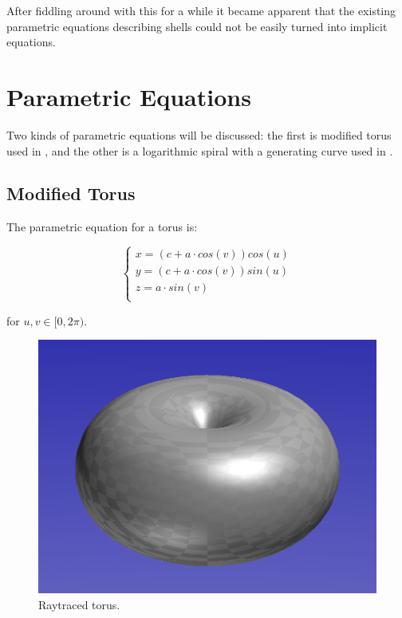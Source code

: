 \documentclass[a4paper]{article}
\begin{document}
After fiddling around with this for a while it became apparent that the existing parametric equations describing shells could not be easily turned into implicit equations.

\section{Parametric Equations}

Two kinds of parametric equations will be discussed: the first is modified torus used in \cite{povray-seashells}, and the other is a logarithmic spiral with a generating curve used in \cite{JORGEPICADO}.

\subsection{Modified Torus}

The parametric equation for a torus is:

\[ 
\begin{cases}
	x = (c + a \cdot cos(v)) cos(u)\\
	y = (c + a \cdot cos(v)) sin(u)\\
	z = a \cdot sin(v)\\
\end{cases}
\]

for $u,v \in  [0, 2\pi)$.

\begin{figure}[h]
	\centering\includegraphics[scale=0.3]{./img/torus.png}
	\caption{Raytraced torus.}
	\label{torus} %
\end{figure}
\end{document}

